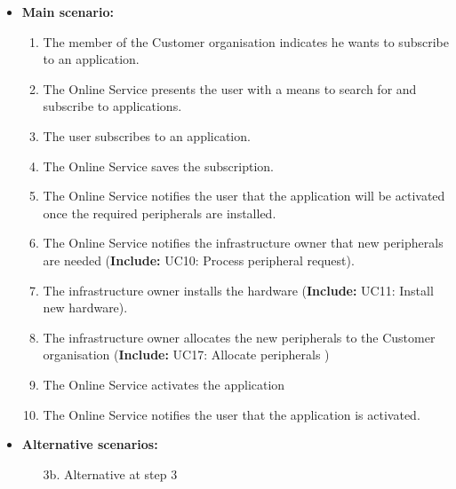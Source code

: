 \documentclass[english]{sareport}
\begin{document}
\begin{itemize}
        
    \item \textbf{Main scenario:} 
    \begin{enumerate}
       \item The member of the Customer organisation indicates he wants to subscribe to an application.
       \item The Online Service presents the user with a means to search for and subscribe to applications.
       \item The user subscribes to an application.
	\item The Online Service saves the subscription.
	\item The Online Service notifies the user that the application will be activated once the required peripherals are installed.
	\item The Online Service notifies the infrastructure owner that new peripherals are needed (\textbf{Include:} UC10: Process peripheral request).
	\item The infrastructure owner installs the hardware (\textbf{Include:} UC11: Install new hardware).
    \item The infrastructure owner allocates the new peripherals to the Customer organisation (\textbf{Include:} UC17: Allocate peripherals )
	\item The Online Service activates the application
	\item The Online Service notifies the user that the application is activated.
    \end{enumerate}

    \item \textbf{Alternative scenarios:} 
    \begin{enumerate}
        \item [3b.] Alternative at step 3
    \end{enumerate}
\end{itemize}
\end{document}
